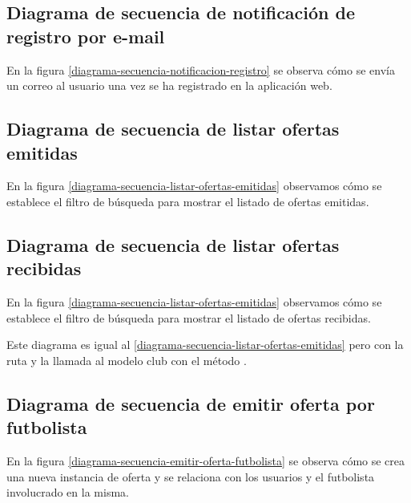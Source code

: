 \subsection{Diagrama de secuencia de notificación de registro por e-mail}
En la figura \ref{diagrama-secuencia-notificacion-registro} se observa cómo se
envía un correo al usuario una vez se ha registrado en la aplicación web.



\subsection{Diagrama de secuencia de listar ofertas emitidas}
En la figura \ref{diagrama-secuencia-listar-ofertas-emitidas} observamos cómo se
establece el filtro de búsqueda para mostrar el listado de ofertas emitidas.


\subsection{Diagrama de secuencia de listar ofertas recibidas}
En la figura \ref{diagrama-secuencia-listar-ofertas-emitidas} observamos cómo se
establece el filtro de búsqueda para mostrar el listado de ofertas recibidas.

Este diagrama es igual al \ref{diagrama-secuencia-listar-ofertas-emitidas} pero
con la ruta  y la llamada al modelo club con
el método .

\subsection{Diagrama de secuencia de emitir oferta por futbolista}
En la figura \ref{diagrama-secuencia-emitir-oferta-futbolista} se observa cómo
se crea una nueva instancia de oferta y se relaciona con los usuarios y el
futbolista involucrado en la misma.


